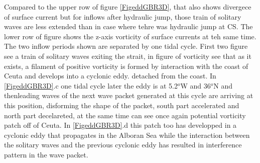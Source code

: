 Compared to the upper row of figure \ref{FigeddGBR3D}, that also shows divergece of surface current but for inflows after hydraulic jump, those train of solitary waves are less extended than in case where tehre was hydraulic jump at CS. The lower row of figure shows the z-axis vorticity of surface currents at teh same time. The two inflow periods shown are separated by one tidal cycle. First two figure see a train of solitary waves exiting the strait, in figure of vorticity see that as it exists, a filament of positive vorticity is formed by interaction with the coast of Ceuta and develops into a cyclonic eddy.  detached from the coast. In \ref{FigeddGBR3D}.c one tidal cycle later the eddy is at 5.2$^o$W and 36$^o$N and thenleading waves of the next wave packet generated at this cycle are arriving at this position, disforming the shape of the packet, south part accelerated and north part decelareted, at the same time can see once again potential vorticity patch off of Ceuta. In \ref{FigeddGBR3D}.d this patch too has developped in a cyclonic eddy that propagates in the Alboran Sea while the interaction between the solitary waves and the previous cyclonic eddy has resulted in interference pattern in the wave packet. 




